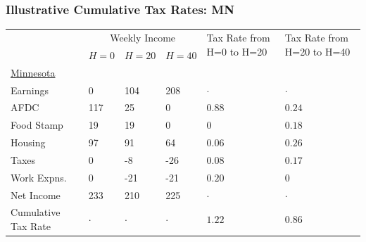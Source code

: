 \documentclass{beamer}
\begin{document}
\begin{frame}
\frametitle[alignment=center]{Illustrative Cumulative Tax Rates: MN}
\begin{table}
\centering
\begin{tabular}{p{2cm}p{1.3cm}p{1.3cm}p{1.3cm}p{1.5cm}p{1.5cm}}
 &  \multicolumn{3}{c}{Weekly Income} & \multirow{3}{*}{\parbox{1.5cm}{Tax Rate from H=0 to H=20}} & \multirow{3}{*}{\parbox{1.5cm}{Tax Rate from H=20 to H=40}} \\
 \cline{2-4}
  &  \multirow{3}{*}{$H=0$} & \multirow{3}{*}{$H=20$} & \multirow{3}{*}{$H=40$} & &  \\
  & & & & \\
    & & & & \\
\hline
\underline{Minnesota} &  &  &  &  &  \\
Earnings & 0 & 104 & 208 & $\cdot$ & $\cdot$\\ 
AFDC & 117 & 25 & 0 & $0.88$ & $0.24$\\ 
Food Stamp & 19 & 19 & 0 & $0$ & $0.18$\\ 
Housing  & 97 & 91 & 64 & $0.06$ & $0.26$\\ 
Taxes & 0 & -8 & -26 & $0.08$ & $0.17$\\ 
Work Expns. & 0 & -21 & -21 & $0.20$ & $0$\\ 
Net Income & 233 & 210 & 225 & $\cdot$ & $\cdot$\\ 
\multirow{2}{*}{\parbox{2cm}{Cumulative Tax Rate}} & \multirow{2}{*}{$\cdot$} & \multirow{2}{*}{$\cdot$} & \multirow{2}{*}{$\cdot$} & \multirow{2}{*}{$1.22$} & \multirow{2}{*}{$0.86$}\\
\end{tabular}
\end{table}
\end{frame}
\end{document}
